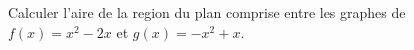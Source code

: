 
\begin{exercice}\label{exodevoir2ajout}

Calculer l'aire de la region du plan comprise entre les graphes de $f(x)= x^2-2x$ et $g(x)= -x^2+x$.

\end{exercice}
